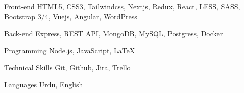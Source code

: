 

\begin{cvskills}

  \cvskill
    {Front-end} %
    {HTML5, CSS3, Tailwindcss, Nextjs, Redux, React, LESS, SASS, Bootstrap 3/4, Vuejs, Angular, WordPress} %

  \cvskill
    {Back-end} %
    {Express, REST API, MongoDB, MySQL, Postgress, Docker } %

  \cvskill
    {Programming} %
    {Node.js, JavaScript, LaTeX} %

  \cvskill
    {Technical Skills} %
    {Git, Github, Jira, Trello} %

  \cvskill
    {Languages} %
    {Urdu, English} %

\end{cvskills}
